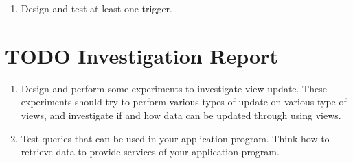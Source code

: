 \documentclass[11pt]{article}
\begin{document}
\begin{enumerate}
\item Design and test at least one trigger.
\end{enumerate}
\section{\textbf{TODO} Investigation Report}
\label{sec-9}


\begin{enumerate}
\item Design and perform some experiments to investigate view
     update. These experiments should try to perform various types of
     update on various type of views, and investigate if and how data
     can be updated through using views.
\item Test queries that can be used in your application program. Think
     how to retrieve data to provide services of your application
     program.
\end{enumerate}
\end{document}
